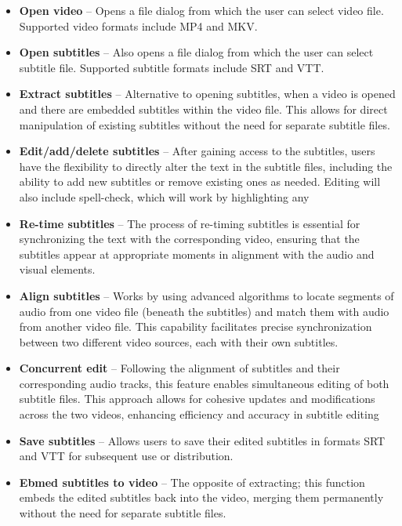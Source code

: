 \begin{itemize}
    \item \textbf{Open video} -- Opens a file dialog from which the user can select video file. Supported video formats include MP4 and MKV.
    \item \textbf{Open subtitles} --  Also opens a file dialog from which the user can select subtitle file. Supported subtitle formats include SRT and VTT. 
    \item \textbf{Extract subtitles} -- Alternative to opening subtitles, when a video is opened and there are embedded subtitles within the video file. This allows for direct manipulation of existing subtitles without the need for separate subtitle files.
    \item \textbf{Edit/add/delete subtitles} -- After gaining access to the subtitles, users have the flexibility to directly alter the text in the subtitle files, including the ability to add new subtitles or remove existing ones as needed. Editing will also include spell-check, which will work by highlighting any 
    \item \textbf{Re-time subtitles} -- The process of re-timing subtitles is essential for synchronizing the text with the corresponding video, ensuring that the subtitles appear at appropriate moments in alignment with the audio and visual elements.
    \item \textbf{Align subtitles} -- Works by using advanced algorithms to locate segments of audio from one video file (beneath the subtitles) and match them with audio from another video file. This capability facilitates precise synchronization between two different video sources, each with their own subtitles.
    \item \textbf{Concurrent edit} -- Following the alignment of subtitles and their corresponding audio tracks, this feature enables simultaneous editing of both subtitle files. This approach allows for cohesive updates and modifications across the two videos, enhancing efficiency and accuracy in subtitle editing
    \item \textbf{Save subtitles} -- Allows users to save their edited subtitles in formats SRT and VTT for subsequent use or distribution.
    \item \textbf{Ebmed subtitles to video } -- The opposite of extracting; this function embeds the edited subtitles back into the video, merging them permanently without the need for separate subtitle files.
\end{itemize}

